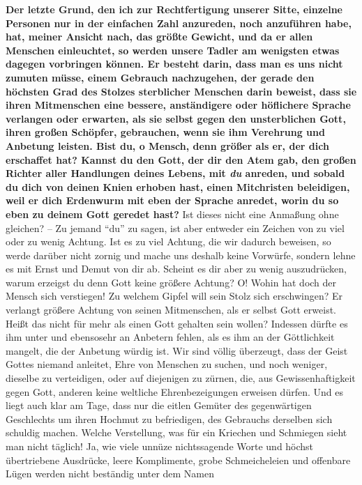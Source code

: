 \label{ref:10_08_duzen} \textbf{Der letzte Grund, den ich zur Rechtfertigung
unserer Sitte, einzelne Personen
nur in der einfachen Zahl anzureden, noch anzuführen habe, hat, meiner Ansicht
nach, das größte Gewicht, und da er allen Menschen einleuchtet, so werden unsere
Tadler am wenigsten etwas dagegen vorbringen können. Er besteht darin, dass man
es uns nicht zumuten müsse, einem Gebrauch nachzugehen, der gerade den
höchsten Grad des Stolzes sterblicher Menschen darin beweist, dass sie ihren
Mitmenschen eine bessere, anständigere oder höflichere Sprache verlangen oder
erwarten, als sie selbst gegen den unsterblichen Gott, ihren großen Schöpfer,
gebrauchen, wenn sie ihm Verehrung und Anbetung leisten.  Bist du, o Mensch, denn
größer als er, der dich erschaffet hat? Kannst du den Gott, der dir den Atem
gab, den großen Richter aller Handlungen deines Lebens, mit \textit{du}
anreden, und
sobald du dich von deinen Knien erhoben hast, einen Mitchristen beleidigen, weil
er dich Erdenwurm mit eben der Sprache anredet, worin du so
eben zu deinem Gott
geredet hast?} Ist dieses nicht eine Anmaßung ohne gleichen? -- Zu jemand "`du"'
zu
sagen, ist aber entweder ein Zeichen von zu viel oder zu wenig Achtung. Ist
es zu viel Achtung, die wir dadurch beweisen, so werde darüber nicht zornig und
mache uns deshalb keine Vorwürfe, sondern lehne es mit Ernst und Demut von
dir ab. Scheint es dir aber zu wenig auszudrücken, warum erzeigst du denn Gott
keine größere Achtung? O! Wohin hat doch der Mensch sich verstiegen! Zu welchem
Gipfel will sein Stolz sich erschwingen? Er verlangt größere Achtung von seinen
Mitmenschen, als er selbst Gott erweist. Heißt das nicht für mehr als einen
Gott gehalten sein wollen? Indessen dürfte es ihm unter und ebensosehr an
Anbetern fehlen, als es ihm an der Göttlichkeit mangelt, die der Anbetung würdig
ist. Wir sind völlig überzeugt, dass der Geist Gottes niemand anleitet, Ehre von
Menschen zu suchen, und noch weniger, dieselbe zu verteidigen, oder auf
diejenigen zu zürnen, die, aus Gewissenhaftigkeit gegen Gott, anderen keine
weltliche Ehrenbezeigungen erweisen dürfen. Und es liegt auch klar am Tage, dass
nur die eitlen Gemüter des gegenwärtigen Geschlechts um ihren Hochmut zu
befriedigen, des Gebrauchs derselben sich schuldig machen. Welche Verstellung,
was für ein Kriechen und Schmiegen sieht man nicht täglich! Ja,
wie viele
unnüze nichtssagende Worte und höchst übertriebene Ausdrücke, leere Komplimente,
grobe Schmeicheleien und offenbare Lügen werden nicht beständig unter dem Namen
